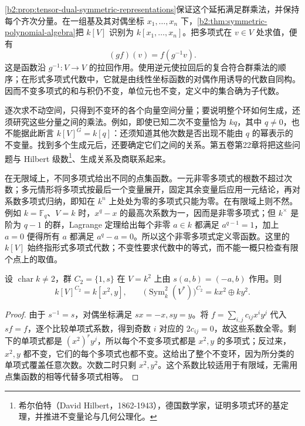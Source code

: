 \cref{b2:prop:tensor-dual-symmetric-representations}保证这个延拓满足群乘法，并保持每个齐次分量。在一组基及其对偶坐标 \(x_1,\ldots,x_n\) 下，\cref{b2:thm:symmetric-polynomial-algebra}把 \(k[V]\) 识别为 \(k[x_1,\ldots,x_n]\)。把多项式在 \(v\in V\) 处求值，便有
\[
	(gf)(v)=f(g^{-1}v).
\]
这是函数沿 \(g^{-1}:V\to V\) 的拉回作用。使用逆元使拉回后的复合符合群乘法的顺序；在形式多项式代数中，它就是由线性坐标函数的对偶作用诱导的代数自同构。因而不变多项式的和与积仍不变，单位元也不变，定义中的集合确为子代数。

\ProseParagraphBreak
逐次求不动空间，只得到不变环的各个向量空间分量；要说明整个环如何生成，还须研究这些分量之间的乘法。例如，即使已知二次不变量恰为 \(kq\)，其中 \(q\ne0\)，也不能据此断言 \(k[V]^G=k[q]\)：还须知道其他次数是否出现不能由 \(q\) 的幂表示的不变量。找到多个生成元后，还要确定它们之间的关系。第五卷第22章将把这些问题与 Hilbert 级数\footnote{希尔伯特（David Hilbert，1862-1943），德国数学家，证明多项式环的基定理，并推进不变量论与几何公理化。}、生成关系及商联系起来。

\ProseParagraphBreak
在无限域上，不同多项式给出不同的点集函数。一元非零多项式的根数不超过次数；多元情形将多项式按最后一个变量展开，固定其余变量后应用一元结论，再对系数多项式归纳，即知在 \(k^n\) 上处处为零的多项式只能为零。在有限域上则不然。例如 \(k=\mathbb F_q\)、\(V=k\) 时，\(x^q-x\) 的最高次系数为一，因而是非零多项式；但 \(k^\times\) 是阶为 \(q-1\) 的群，Lagrange 定理给出每个非零 \(a\in k\) 都满足 \(a^{q-1}=1\)，加上 \(a=0\) 便得所有 \(a\) 都满足 \(a^q-a=0\)。所以这个非零多项式定义零函数。这里的 \(k[V]\) 始终指形式多项式代数；不变性要求代数中的等式，而不能一概只检查有限个点上的取值。

\newpage
\begin{example}\label{b2:exm:reflection-polynomial-invariants}
	设 \(\operatorname{char}k\ne2\)，群 \(C_2=\{1,s\}\) 在 \(V=k^2\) 上由 \(s(a,b)=(-a,b)\) 作用。则
	\[
		k[V]^{C_2}=k[x^2,y],\qquad \bigl(\operatorname{Sym}^2_k(V^*)\bigr)^{C_2} =kx^2\oplus ky^2.
	\]
\end{example}
\begin{proof}
	由于 \(s^{-1}=s\)，对偶坐标满足 \(sx=-x,sy=y\)。将 \(f=\sum_{i,j}c_{ij}x^iy^j\) 代入 \(sf=f\)，逐个比较单项式系数，得到奇数 \(i\) 对应的 \(2c_{ij}=0\)，故这些系数全零。剩下的单项式都是 \((x^2)^r y^j\)，所以每个不变多项式都是 \(x^2,y\) 的多项式；反过来，\(x^2,y\) 都不变，它们的每个多项式也都不变。这给出了整个不变环，因为所分类的单项式覆盖任意次数。次数二时只剩 \(x^2,y^2\)。这个系数比较适用于有限域，无需用点集函数的相等代替多项式相等。
\end{proof}


